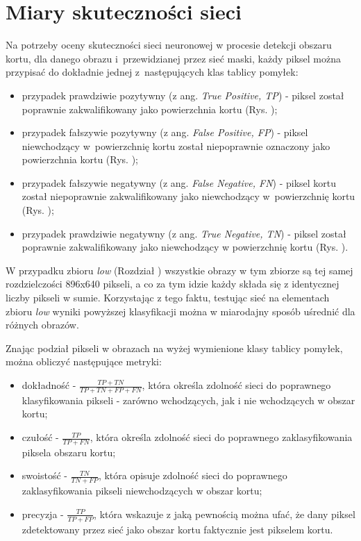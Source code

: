 \section{Miary skuteczności sieci}

Na potrzeby oceny skuteczności sieci neuronowej w procesie detekcji obszaru kortu, dla danego obrazu i~przewidzianej przez sieć maski, każdy piksel można przypisać do dokładnie jednej z~następujących klas tablicy pomyłek:

\begin{itemize}
  \item przypadek prawdziwie pozytywny (z ang. \textit{True Positive, TP}) - piksel został poprawnie zakwalifikowany jako powierzchnia kortu (Rys. );
  \item przypadek fałszywie pozytywny (z ang. \textit{False Positive, FP}) - piksel niewchodzący w~powierzchnię kortu został niepoprawnie oznaczony jako powierzchnia kortu (Rys. );
  \item przypadek fałszywie negatywny (z ang. \textit{False Negative, FN}) - piksel kortu został niepoprawnie zakwalifikowany jako niewchodzący w~powierzchnię kortu (Rys. );
  \item przypadek prawdziwie negatywny (z ang. \textit{True Negative, TN}) - piksel został poprawnie zakwalifikowany jako niewchodzący w powierzchnię kortu (Rys. ).
\end{itemize}

W przypadku zbioru \textit{low} (Rozdział ) wszystkie obrazy w tym zbiorze są tej samej rozdzielczości 896x640 pikseli, a co za tym idzie każdy składa się z identycznej liczby pikseli w sumie.
Korzystając z tego faktu, testując sieć na elementach zbioru \textit{low} wyniki powyższej klasyfikacji można w miarodajny sposób uśrednić dla różnych obrazów.

Znając podział pikseli w obrazach na wyżej wymienione klasy tablicy pomyłek, można obliczyć następujące metryki:

\begin{itemize}
  \label{sec:miary}
  \item dokładność - $ \frac{TP + TN}{TP + TN + FP + FN} $, która określa zdolność sieci do poprawnego klasyfikowania pikseli - zarówno wchodzących, jak i nie wchodzących w obszar kortu;
  \item czułość - $ \frac{TP}{TP + FN} $, która określa zdolność sieci do poprawnego zaklasyfikowania piksela obszaru kortu;
  \item swoistość - $ \frac{TN}{TN + FP} $, która opisuje zdolność sieci do poprawnego zaklasyfikowania pikseli niewchodzących w obszar kortu; 
  \item precyzja - $ \frac{TP}{TP + FP} $, która wskazuje z jaką pewnością można ufać, że dany piksel zdetektowany przez sieć jako obszar kortu faktycznie jest pikselem kortu.
\end{itemize}

